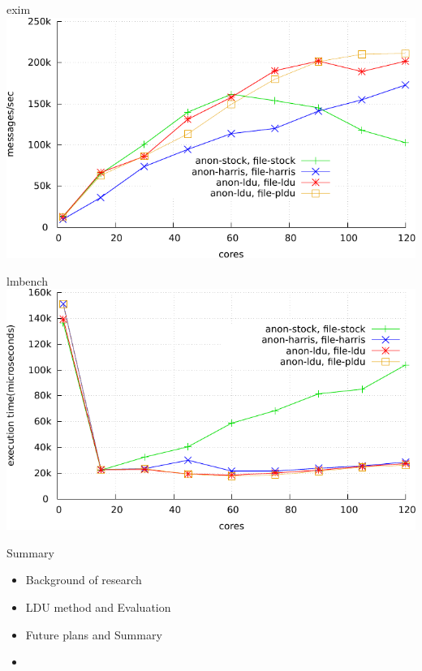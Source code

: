 \documentclass[english]{beamer} %
\begin{document}
\begin{frame}{exim}
\includegraphics[width=\textwidth,height=0.8\textheight,
keepaspectratio]{exim}
\end{frame}


\begin{frame}{lmbench}
\includegraphics[width=\textwidth,height=0.8\textheight,
keepaspectratio]{lmbench}
\end{frame}



\begin{frame}{Summary}
	\begin{itemize}
	\item Background of research 
	\item LDU method and Evaluation
	\item Future plans and Summary
	\item {}
	\end{itemize}
\end{frame}
\end{document}
